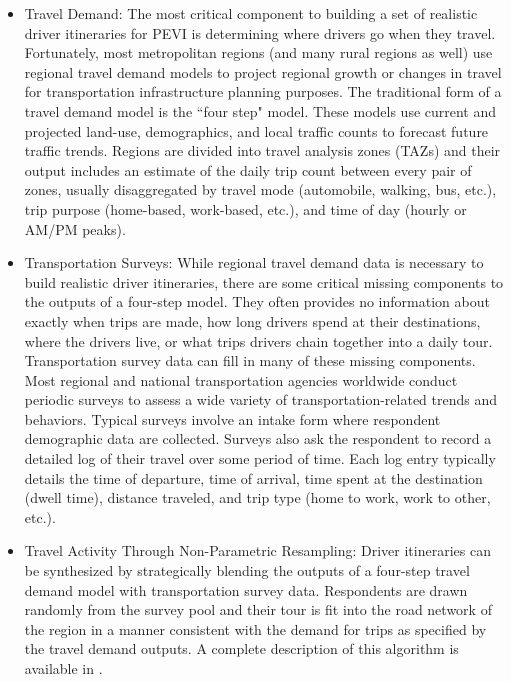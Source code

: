 \documentclass[journal]{IEEEtran}
\begin{document}
\begin{itemize}
  \item Travel Demand: The most critical component to building a set of realistic driver itineraries for PEVI is determining where drivers go when they travel.  Fortunately, most metropolitan regions (and many rural regions as well) use regional travel demand models to project regional growth or changes in travel for transportation infrastructure planning purposes.  
  The traditional form of a travel demand model is the ``four step" model.  These models use current and projected land-use, demographics, and local traffic counts to forecast future traffic trends.  Regions are divided into travel analysis zones (TAZs) and their output includes an estimate of the daily trip count between every pair of zones, usually disaggregated by travel mode (automobile, walking, bus, etc.), trip purpose (home-based, work-based, etc.), and time of day (hourly or AM/PM peaks).

  \item Transportation Surveys: While regional travel demand data is necessary to build realistic driver itineraries, there are some critical missing components to the outputs of a four-step model.  They often provides no information about exactly when trips are made, how long drivers spend at their destinations, where the drivers live, or what trips drivers chain together into a daily tour.  Transportation survey data can fill in many of these missing components.  
  Most regional and national transportation agencies worldwide conduct periodic surveys to assess a wide variety of transportation-related trends and behaviors.  Typical surveys involve an intake form where respondent demographic data are collected.  Surveys also ask the respondent to record a detailed log of their travel over some period of time.  Each log entry typically details the time of departure, time of arrival, time spent at the destination (dwell time), distance traveled, and trip type (home to work, work to other, etc.).

  \item Travel Activity Through Non-Parametric Resampling: Driver itineraries can be synthesized by strategically blending the outputs of a four-step travel demand model with transportation survey data.  Respondents are drawn randomly from the survey pool and their tour is fit into the road network of the region in a manner consistent with the demand for trips as specified by the travel demand outputs. A complete description of this algorithm is available in \cite{sudatta_mohanty_preliminary_2015}. 
\end{itemize}
\end{document}
